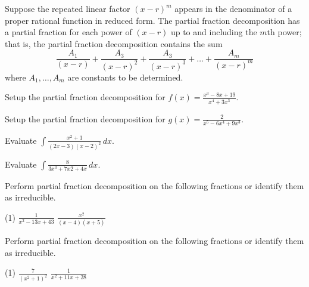 \documentclass[../mathNotesPreamble]{subfiles}
\begin{document}
  \begin{thmBox*}
    Suppose the repeated linear factor $(x-r)^m$ appears in the denominator of a proper rational function in reduced form. The partial fraction decomposition has a partial fraction for each power of $(x-r)$ up to and including the $m$th power; that is, the partial fraction decomposition contains the sum  
    \[\frac{A_1}{(x-r)}+\frac{A_3}{(x-r)^2}+\frac{A_3}{(x-r)^3}+\dots+\frac{A_m}{(x-r)^m}\]
    where $A_1,\dots,A_m$ are constants to be determined.
  \end{thmBox*}
  \begin{ex*}
    Setup the partial fraction decomposition for $\displaystyle f(x)=\frac{x^3-8x+19}{x^4+3x^3}$.
  \end{ex*}
  \begin{ex*}
    Setup the partial fraction decomposition for $\displaystyle g(x)=\frac{2}{x^5-6x^4+9x^3}$.
  \end{ex*}
  \pagebreak

  \begin{ex*}
    Evaluate $\displaystyle \int \frac{x^2+1}{(2x-3)(x-2)^2}\,dx$.
  \end{ex*}
  \pagebreak

  \begin{ex*}
    Evaluate $\displaystyle \int \frac{8}{3x^3+7x2+4x}\,dx$.
  \end{ex*}
  \pagebreak

  \begin{ex*}
    Perform partial fraction decomposition on the following fractions or identify them as irreducible.
  \end{ex*}
  \begin{tasks}[after-item-skip=\stretch{1}, label=, item-indent=0mm](1)
    \task $\displaystyle \frac{1}{x^2-13x+43}$
    \task $\displaystyle \frac{x^2}{(x-4)(x+5)}$
  \end{tasks}
  \pagebreak

  \begin{ex*}
    Perform partial fraction decomposition on the following fractions or identify them as irreducible.
  \end{ex*}
  \begin{tasks}[after-item-skip=\stretch{1}, label=, item-indent=0mm](1)
    \task $\displaystyle \frac{7}{(x^2+1)^2}$
    \task $\displaystyle \frac{1}{x^2+11x+28}$
  \end{tasks}
  \pagebreak
\end{document}
